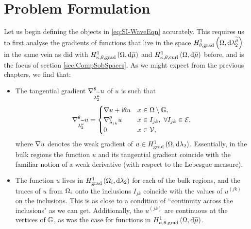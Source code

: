 \section{Problem Formulation} \label{sec:SI-ProblemFormulation}
Let us begin defining the objects in \eqref{eq:SI-WaveEqn} accurately.
This requires us to first analyse the gradients of functions that live in the space $H^1_{\theta, \mathrm{grad}}\left( \Omega, \mathrm{d}\lambda_2^{\widetilde{\mu}} \right)$ in the same vein as did with $H^1_{\kappa,\theta,\mathrm{grad}}\left( \Omega, \mathrm{d}\widetilde{\mu} \right)$ and $H^1_{\kappa,\theta,\mathrm{curl}}\left( \Omega, \mathrm{d}\widetilde{\mu} \right)$ before, and is the focus of section \ref{sec:CompSobSpaces}.
As we might expect from the previous chapters, we find that:
\begin{itemize}
	\item The tangential gradient $\nabla^{\theta}_{\lambda_2^{\widetilde{\mu}}}u$ of $u$ is such that
	\begin{align*}
		\nabla^{\theta}_{\lambda_2^{\widetilde{\mu}}}u = 
		\begin{cases} 
			\nabla u + \mathrm{i}\theta u & x\in\Omega\setminus\mathbb{G}, \\ 
			\nabla^{\theta}_{\lambda_{jk}}u & x\in I_{jk}, \ \forall I_{jk}\in\mathcal{E}, \\
			0 & x\in\mathcal{V},			
		\end{cases}
	\end{align*}
	where $\nabla u$ denotes the weak gradient of $u\in H^1_\mathrm{grad}\left( \Omega, \mathrm{d}\lambda_2 \right)$.
	Essentially, in the bulk regions the function $u$ and its tangential gradient coincide with the familiar notion of a weak derivative (with respect to the Lebesgue measure).
	\item The function $u$ lives in $H^1_\mathrm{grad}\left( \Omega_i, \mathrm{d}\lambda_2 \right)$ for each of the bulk regions, and the traces of $u$ from $\Omega_i$ onto the inclusions $I_{jk}$ coincide with the values of $u^{(jk)}$ on the inclusions.
	This is as close to a condition of ``continuity across the inclusions" as we can get.
	Additionally, the $u^{(jk)}$ are continuous at the vertices of $\mathbb{G}$, as was the case for functions in $H^1_{\kappa,\theta,\mathrm{grad}}\left( \Omega, \mathrm{d}\widetilde{\mu} \right)$.
\end{itemize}

